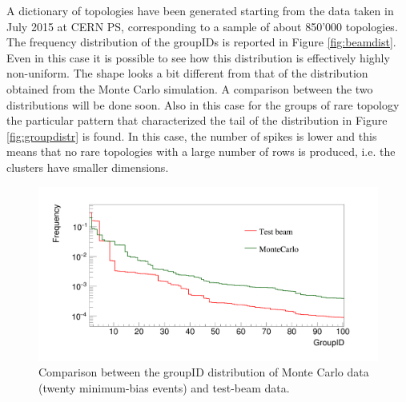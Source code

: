 %
A dictionary of topologies have been generated starting from the data taken in July 2015 at CERN PS, corresponding to a sample of about 850'000 topologies. The frequency distribution of the groupIDs is reported in Figure \ref{fig:beamdist}. Even in this case it is possible to see how this distribution is effectively highly non-uniform. The shape looks a bit different from that of the distribution obtained from the Monte Carlo simulation. A comparison between the two distributions will be done soon. Also in this case for the groups of rare topology the particular pattern that characterized the tail of the distribution in Figure \ref{fig:groupdistr} is found. In this case, the number of spikes is lower and this means that no rare topologies with a large number of rows is produced, i.e. the clusters have smaller dimensions.
%
\begin{figure}
  \centering
  \includegraphics[scale=0.22]{figures/realcomp.png}
  \caption{Comparison between the groupID distribution of Monte Carlo data (twenty minimum-bias events) and test-beam data.}
  \label{fig:realcomp}
\end{figure}
%
